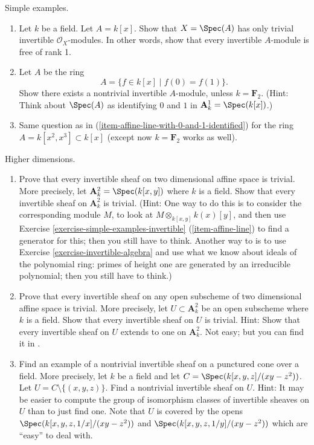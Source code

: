\begin{exercise}
\label{exercise-simple-examples-invertible}
Simple examples.
\begin{enumerate}
\item
\label{item-affine-line}
Let $k$ be a field. Let $A = k[x]$.
Show that $X = \Spec(A)$ has only trivial invertible
${\mathcal O}_X$-modules. In other words, show that every
invertible $A$-module is free of rank 1.
\item
\label{item-affine-line-with-0-and-1-identified}
Let $A$ be the ring
$$
A = \{ f\in k[x] \mid f(0) = f(1) \}.
$$
Show there exists a nontrivial invertible $A$-module, unless
$k = {\mathbf F}_2$. (Hint: Think about $\Spec(A)$ as identifying
$0$ and $1$ in ${\mathbf A}^1_k = \Spec(k[x])$.)
\item
\label{item-affine-line-with-cusp}
Same question as in (\ref{item-affine-line-with-0-and-1-identified})
for the ring $A = k[x^2, x^3] \subset k[x]$
(except now $k = {\mathbf F}_2$ works as well).
\end{enumerate}
\end{exercise}

\begin{exercise}
\label{exercise-higher-dimension-invertible}
Higher dimensions.
\begin{enumerate}
\item Prove that every invertible sheaf on two dimensional
affine space is trivial. More precisely, let
${\mathbf A}^2_k = \Spec(k[x, y])$ where $k$ is a field.
Show that every invertible sheaf on ${\mathbf A}^2_k$ is trivial.
(Hint: One way to do this is to consider the corresponding
module $M$, to look at $M \otimes_{k[x, y]} k(x)[y]$, and
then use
Exercise \ref{exercise-simple-examples-invertible} (\ref{item-affine-line})
to find a generator for this; then you still have to think.
Another way to is to use
Exercise \ref{exercise-invertible-algebra}
and use what we know about ideals of the
polynomial ring: primes of height one are generated by an irreducible
polynomial; then you still have to think.)
\item Prove that every invertible sheaf on any open
subscheme of two dimensional affine space is trivial. More precisely, let
$U \subset {\mathbf A}^2_k$ be an open subscheme where $k$ is a field.
Show that every invertible sheaf on $U$ is trivial. Hint: Show that every
invertible sheaf on $U$ extends to one on ${\mathbf A}^2_k$. Not easy;
but you can find it in \cite{H}.
\item Find an example of a nontrivial
invertible sheaf on a punctured cone over a field. More
precisely, let $k$ be a field and let $C = \Spec(k[x, y, z]/(xy-z^2))$.
Let $U = C \setminus \{ (x, y, z) \}$. Find a nontrivial
invertible sheaf on $U$. Hint: It may be easier to compute the
group of isomorphism classes of invertible sheaves on $U$ than to
just find one. Note that $U$ is covered by the opens
$\Spec(k[x, y, z, 1/x]/(xy-z^2))$ and
$\Spec(k[x, y, z, 1/y]/(xy-z^2))$
which are ``easy'' to deal with.
\end{enumerate}
\end{exercise}

